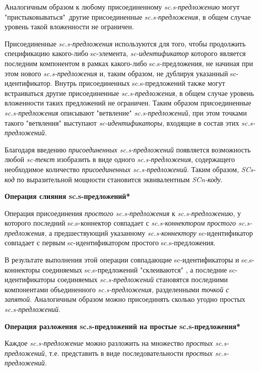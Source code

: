 \begin{textitemize}
		Аналогичным образом к любому присоединенному \textit{sc.s-предложению} могут "пристыковываться"\ другие присоединенные \textit{sc.s-предложения}, в общем случае уровень такой вложенности не ограничен.
		
		Присоединенные \textit{sc.s-предложения} используются для того, чтобы продолжить спецификацию какого-либо sc-элемента, \textit{sc-идентификатор} которого является последним компонентом в рамках какого-либо sc.s-предложения, не начиная при этом нового \textit{sc.s-предложения} и, таким образом, не дублируя указанный \mbox{sc-идентификатор}. Внутрь присоединенных sc.s-предложений также могут встраиваться другие присоединенные \textit{sc.s-предложения}, в общем случае уровень вложенности таких предложений не ограничен. Таким образом присоединенные \textit{sc.s-предложения} описывают "ветвление"{} \textit{sc.s-предложений}, при этом точками такого "ветвления"{} выступают \textit{sc-идентификаторы}, входящие в состав этих \textit{sc.s-предложений}.
		
		Благодаря введению \textit{присоединенных sc.s-предложений} появляется возможность любой \textit{sc-текст} изобразить в виде одного \textit{sc.s-предложения}, содержащего необходимое количество \textit{присоединенных sc.s-предложений}. Таким образом, \textit{SCs-код} по выразительной мощности становится эквивалентным \textit{SCn-коду}.
	
	\item \textbf{Операция слияния sc.s-предложений*}
		
		Операция присоединения \textit{простого sc.s-предложения} к \textit{sc.s-предложению}, у которого последний sc.s-коннектор совпадает с \textit{sc.s-коннектором} \textit{простого sc.s-предложения}, а предшествующий указанному \textit{sc.s-коннектору} sc-идентификатор совпадает с первым sc-идентификатором простого sc.s-предложения.
		
		В результате выполнения этой операции совпадающие sc-идентификаторы и sc.s-коннекторы соединяемых sc.s-предложений "склеиваются"{} , а последние sc-идентификаторы соединяемых \textit{sc.s-предложений} становятся последними компонентами объединенного \textit{sc.s-предложения},
		разделенными \textit{точкой с запятой}. Аналогичным образом можно присоединять сколько угодно простых \textit{sc.s-предложений}.
	
	\item \textbf{Операция разложения sc.s-предложений на простые sc.s-предложения*}
		
		Каждое \textit{sc.s-предложение} можно разложить на множество \textit{простых sc.s-предложений}, т.е. представить в виде последовательности \textit{простых sc.s-предложений}.
	

\end{textitemize}
